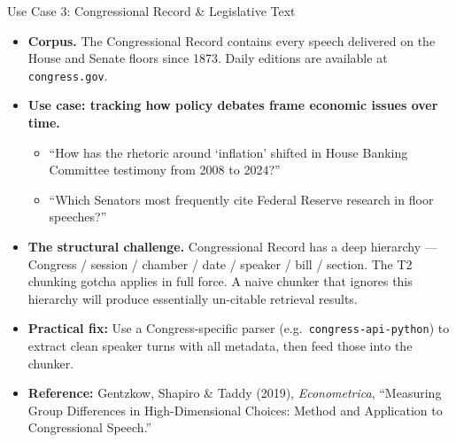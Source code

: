 \begin{frame}{Use Case 3: Congressional Record \& Legislative Text}
\begin{itemize}
\item \textbf{Corpus.} The Congressional Record contains every speech delivered on the House and Senate floors since 1873. Daily editions are available at \texttt{congress.gov}.

\medskip
\item \textbf{Use case: tracking how policy debates frame economic issues over time.}
\begin{itemize}
    \item ``How has the rhetoric around `inflation' shifted in House Banking Committee testimony from 2008 to 2024?''
    \item ``Which Senators most frequently cite Federal Reserve research in floor speeches?''
\end{itemize}

\medskip
\item \textbf{The structural challenge.} Congressional Record has a deep hierarchy --- Congress / session / chamber / date / speaker / bill / section. The T2 chunking gotcha applies in full force. A naive chunker that ignores this hierarchy will produce essentially un-citable retrieval results.

\medskip
\item \textbf{Practical fix:} Use a Congress-specific parser (e.g.\ \texttt{congress-api-python}) to extract clean speaker turns with all metadata, then feed those into the chunker.

\medskip
\item \textbf{Reference:} Gentzkow, Shapiro \& Taddy (2019), \emph{Econometrica}, ``Measuring Group Differences in High-Dimensional Choices: Method and Application to Congressional Speech.''
\end{itemize}
\end{frame}

